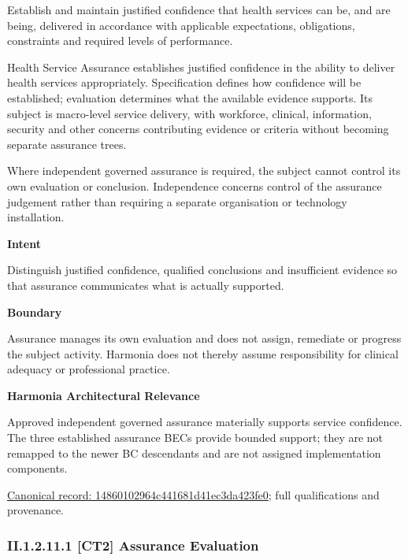 Establish and maintain justified confidence that health services can be, and are being, delivered in accordance with applicable expectations, obligations, constraints and required levels of performance.



Health Service Assurance establishes justified confidence in the ability to deliver health services appropriately. Specification defines how confidence will be established; evaluation determines what the available evidence supports. Its subject is macro-level service delivery, with workforce, clinical, information, security and other concerns contributing evidence or criteria without becoming separate assurance trees.



Where independent governed assurance is required, the subject cannot control its own evaluation or conclusion. Independence concerns control of the assurance judgement rather than requiring a separate organisation or technology installation.



\textbf{Intent}



Distinguish justified confidence, qualified conclusions and insufficient evidence so that assurance communicates what is actually supported.



\textbf{Boundary}



Assurance manages its own evaluation and does not assign, remediate or progress the subject activity. Harmonia does not thereby assume responsibility for clinical adequacy or professional practice.



\textbf{Harmonia Architectural Relevance}



Approved independent governed assurance materially supports service confidence. The three established assurance BECs provide bounded support; they are not remapped to the newer BC descendants and are not assigned implementation components.


{\footnotesize \href{../../../../../../../continuum/strategy/capability/14860102964c441681d41ec3da423fe0.md}{Canonical record: 14860102964c441681d41ec3da423fe0}; full qualifications and provenance.}\par
\subsubsection*{II.1.2.11.1 [CT2] Assurance Evaluation}
\label{navigation:II.1.2.11.1}


